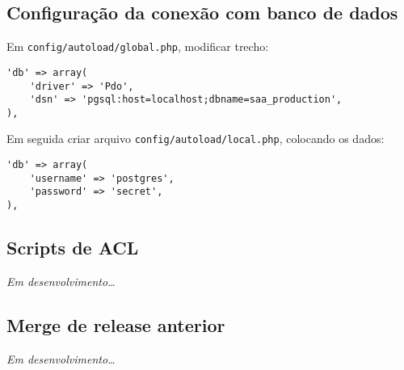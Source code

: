 \subsection{Configuração da conexão com banco de
dados}\label{configurauxe7uxe3o-da-conexuxe3o-com-banco-de-dados}

Em \texttt{config/autoload/global.php}, modificar trecho:

\begin{verbatim}
'db' => array(
    'driver' => 'Pdo',
    'dsn' => 'pgsql:host=localhost;dbname=saa_production',
),
\end{verbatim}

Em seguida criar arquivo \texttt{config/autoload/local.php}, colocando
os dados:

\begin{verbatim}
'db' => array(
    'username' => 'postgres',
    'password' => 'secret',
),
\end{verbatim}

\subsection{Scripts de ACL}\label{scripts-de-acl}

\emph{Em desenvolvimento\ldots{}}

\subsection{Merge de release anterior}\label{merge-de-release-anterior}

\emph{Em desenvolvimento\ldots{}}
